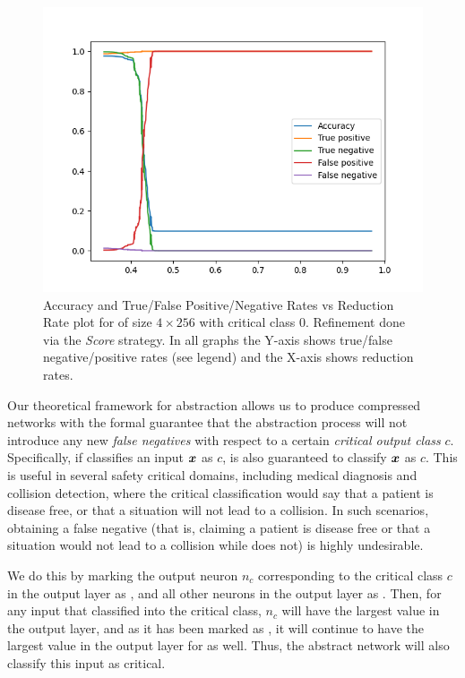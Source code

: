 \begin{figure}
    \vspace*{-1cm}
    \includegraphics[scale=0.4]{figs/mnist-compr-4-256-samples.png}
    \caption{Accuracy and True/False Positive/Negative Rates vs Reduction Rate
        plot for \mnist of size $4 \times 256$ with critical class 0. Refinement
    done via the \emph{Score} strategy. In all graphs the Y-axis shows
    true/false negative/positive rates (see legend) and the X-axis shows
    reduction rates.   }
    \label{f:mnist-class}
    \vspace*{-1cm}
\end{figure}

Our theoretical framework for abstraction allows us to produce compressed
networks with the formal guarantee that the abstraction process will not
introduce any new \emph{false negatives} with respect to a certain
\emph{critical output class} $c$. Specifically, if \cnc classifies an input
$\boldsymbol{x}$ as $c$, \abs is also guaranteed to classify $\boldsymbol{x}$ as $c$. This is
useful in several safety critical domains, including medical diagnosis and
collision detection, where the critical classification would say that a patient
is disease free, or that a situation will not lead to a collision. In such
scenarios, obtaining a false negative (that is, \abs claiming a
patient is disease free or that a situation would not lead to a collision while
\cnc does not) is highly undesirable. 

We do this by marking the output neuron $n_c$ corresponding to the critical
class $c$ in the output layer as \inc, and all other neurons in the output layer
as \dec.  Then, for any input that \cnc classified into
the critical class, $n_c$ will have the largest value in the
output layer, and as it has been marked as \inc, it will continue to have the
largest value in the output layer for \abs as well. Thus, the
abstract network will also classify this input as critical. 

